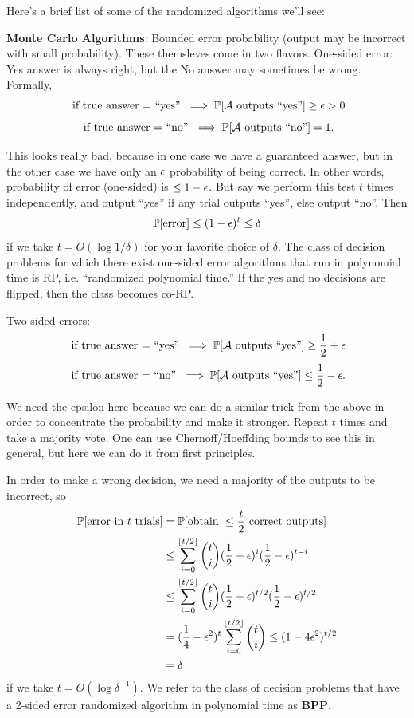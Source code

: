 \documentclass[11 pt]{scrartcl}
\newcommand{\alg}{\mathcal{A}}
\begin{document}
Here's a brief list of some of the randomized algorithms we'll see: 
\begin{enumerate}
    \ii \textbf{Monte Carlo Algorithms}: Bounded error probability (output may be incorrect with small probability). These themsleves come in two flavors. 
    \alphanum
    \ii One-sided error: Yes answer is always right, but the No answer may sometimes be wrong. Formally, 
    \[ \text{ if true answer = ``yes'' }\implies \PP[\alg\text{ outputs ``yes''}] \geq \eps > 0 \]
    \[ \text{ if true answer = ``no'' }\implies \PP[\alg\text{ outputs ``no''}] = 1.\]

    This looks really bad, because in one case we have a guaranteed answer, but in the other case we have only an $\epsilon$ probability of being correct. In other words, probability of error (one-sided) is $\leq 1-\epsilon$. But say we perform this test $t$ times independently, and output ``yes'' if any trial outputs ``yes'', else output ``no''. Then 
    \[ \mathbb P[\text{error}] \leq (1-\epsilon)^t \leq \delta\] 
    if we take $t = O(\log 1/\delta)$ for your favorite choice of $\delta$. The class of decision problems for which there exist one-sided error algorithms that run in polynomial time is RP, i.e. ``randomized polynomial time.'' If the yes and no decisions are flipped, then the class becomes co-RP. 

    \ii Two-sided errors:  
    \[ \text{ if true answer = ``yes'' }\implies \PP[\alg\text{ outputs ``yes''}] \geq \frac{1}{2} + \eps \]
    \[ \text{ if true answer = ``no'' }\implies \PP[\alg\text{ outputs ``yes''}] \leq \frac{1}{2} - \eps .\]
    
    We need the epsilon here because we can do a similar trick from the above in order to concentrate the probability and make it stronger. Repeat $t$ times and take a majority vote. One can use Chernoff/Hoeffding bounds to see this in general, but here we can do it from first principles. 

    In order to make a wrong decision, we need a majority of the outputs to be incorrect, so 
    \begin{align*}
        \mathbb P[\text{error in }t\text{ trials}] &= \mathbb P[\text{obtain } \leq \frac{t}{2}\text{ correct outputs}] \\ 
                                             &\leq \sum_{i=0}^{\lfloor t/2\rfloor} \dbinom{t}{i} (\frac{1}{2} + \epsilon)^i (\frac{1}{2}-\epsilon)^{t-i} \\ 
                                             &\leq \sum_{i=0}^{\lfloor t/2\rfloor} \dbinom{t}{i} (\frac{1}{2} + \epsilon)^{t/2} (\frac{1}{2}-\epsilon)^{t/2} \\ 
                                             &= (\frac{1}{4} - \epsilon^2) ^ t \sum_{i=0}^{\lfloor t/2\rfloor} \dbinom{t}{i} \leq (1-4\epsilon^2)^{t/2} \\ 
                                             &= \delta
    \end{align*}
    if we take $t = O(\log \delta^{-1})$. We refer to the class of decision problems that have a 2-sided error randomized algorithm in polynomial time as \textbf{BPP}.
    \enumend


\end{enumerate}
\end{document}
